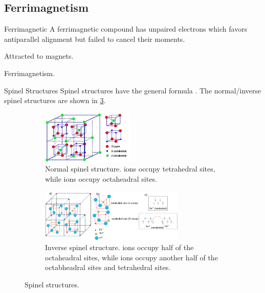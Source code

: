\documentclass[hidelinks]{article}
\begin{document}

\subsection{Ferrimagnetism} %
\label{sub:ferrimagnetism}

\begin{termdef}[\baselineskip]{Ferrimagnetic}
    A ferrimagnetic compound has unpaired electrons which favors antiparallel alignment but failed to cancel their moments.
    \begin{citemize}
        \item Attracted to magnets.
    \end{citemize}
\end{termdef}%
\begin{marginfigure}%
\captionsetup{justification=raggedright, width=1.5in}
    \caption{Ferrimagnetism.}%
\end{marginfigure}%
\begin{margindef}[1cm]{Spinel Structures}\RaggedRight
    Spinel structures have the general formula .
    The normal/inverse spinel structures are shown in \cref{fig:SpinelStructures}.
\end{margindef}
\begin{figure}[ht]
    \centering
    \begin{subfigure}[t]{.3\textwidth}
        \centering
        \includegraphics[height=1in]{src/spinel.png}
        \caption{Normal spinel structure.  ions occupy tetrahedral sites, while  ions occupy octaheadral sites.}
        \label{fig:NormalSpinelStructure}
    \end{subfigure}
    \begin{subfigure}[t]{.66\textwidth}
        \centering
        \includegraphics[height=1in]{src/inverse-spinel.png}
        \captionsetup{width=0.75\textwidth}
        \caption{Inverse spinel structure.  ions occupy half of the octaheadral sites, while  ions occupy another half of the octabheadral sites and tetrahedral sites.}
        \label{fig:InverseSpinelStructure}
    \end{subfigure}
    \caption{Spinel structures.}
    \label{fig:SpinelStructures}
\end{figure}
\end{document}
